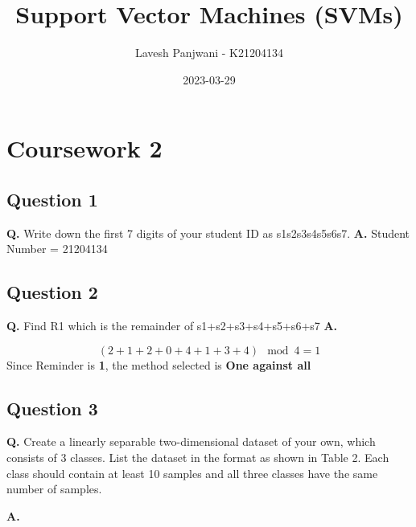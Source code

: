 \documentclass[12pt]{report}
\title{Support Vector Machines (SVMs)}
\author{Lavesh Panjwani - K21204134}
\date{2023-03-29}
\begin{document}
\maketitle

\tableofcontents

\pagebreak

\chapter{Coursework 2}

\section{Question 1}

\textbf{Q.} Write down the first 7 digits of your student ID as s1s2s3s4s5s6s7.\newline\newline
\textbf{A.} Student Number = 21204134

\section{Question 2}

\textbf{Q.} Find R1 which is the remainder of s1+s2+s3+s4+s5+s6+s7\newline\newline
\textbf{A.} \newline

\[{(2 + 1 + 2 + 0 + 4 + 1 + 3 + 4)} \mod 4 = 1 \]\newline\newline
Since Reminder is \textbf{1}, the method selected is \textbf{One against all}

\section{Question 3}

\textbf{Q.} Create a linearly separable two-dimensional dataset of your own, which consists of
3 classes. List the dataset in the format as shown in Table 2. Each class should
contain at least 10 samples and all three classes have the same number of samples.\newline\newline

\textbf{A.}\newline
\end{document}
